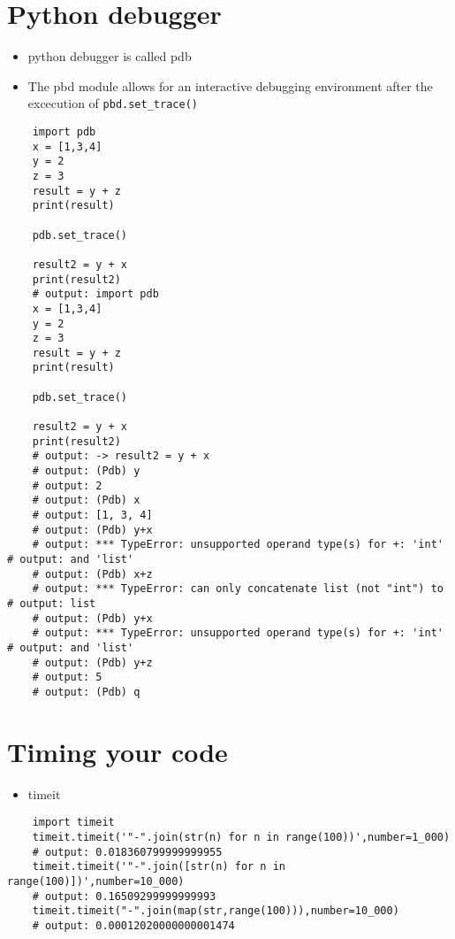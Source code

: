 \section{Python debugger}
\begin{itemize}
    \item python debugger is called pdb 
    \item The pbd module allows for an interactive debugging environment after the excecution of \verb|pbd.set_trace()|
\end{itemize}
\begin{verbatim}
    import pdb 
    x = [1,3,4]
    y = 2 
    z = 3 
    result = y + z 
    print(result)

    pdb.set_trace()

    result2 = y + x 
    print(result2)
    # output: import pdb 
    x = [1,3,4]
    y = 2 
    z = 3 
    result = y + z 
    print(result)

    pdb.set_trace()

    result2 = y + x 
    print(result2)
    # output: -> result2 = y + x
    # output: (Pdb) y
    # output: 2     
    # output: (Pdb) x
    # output: [1, 3, 4]
    # output: (Pdb) y+x
    # output: *** TypeError: unsupported operand type(s) for +: 'int' # output: and 'list'
    # output: (Pdb) x+z
    # output: *** TypeError: can only concatenate list (not "int") to # output: list
    # output: (Pdb) y+x
    # output: *** TypeError: unsupported operand type(s) for +: 'int' # output: and 'list'
    # output: (Pdb) y+z
    # output: 5
    # output: (Pdb) q
\end{verbatim}

\section{Timing your code}
\begin{itemize}
    \item timeit 
\end{itemize}
\begin{verbatim}
    import timeit 
    timeit.timeit('"-".join(str(n) for n in range(100))',number=1_000)
    # output: 0.018360799999999955
    timeit.timeit('"-".join([str(n) for n in range(100)])',number=10_000)
    # output: 0.16509299999999993
    timeit.timeit("-".join(map(str,range(100))),number=10_000)
    # output: 0.00012020000000001474
\end{verbatim}

